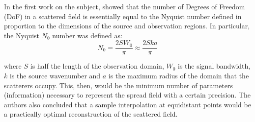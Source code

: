 			In the first work on the subject, \cite{bucci1989degrees} showed that the number of Degrees of Freedom (DoF) in a scattered field is essentially equal to the Nyquist number defined in proportion to the dimensions of the source and observation regions. In particular, the Nyquist $N_0$ number was defined as:
			\begin{equation}
				N_0 = \frac{2SW_0}{\pi} \approx \frac{2Ska}{\pi} \label{eq:2:dof:1}
			\end{equation}
		
			\noindent where $S$ is half the length of the observation domain, $W_0$ is the signal bandwidth, $k$ is the source wavenumber  and $a$ is the maximum radius of the domain that the scatterers occupy. This, then, would be the minimum number of parameters (information) necessary to represent the spread field with a certain precision. The authors also concluded that a sample interpolation at equidistant points would be a practically optimal reconstruction of the scattered field.
			

